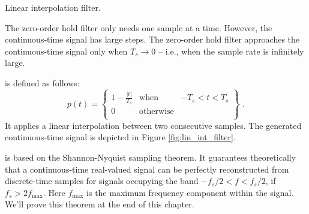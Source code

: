 \begin{marginfigure}
  \begin{center}
  \end{center}
  \caption{Linear interpolation filter.}
  \label{fig:lin_int_filter}
\end{marginfigure}

The zero-order hold filter only needs one sample at a time. However, the continuous-time signal has large steps.
The zero-order hold filter approaches the continuous-time signal only when $T_s\rightarrow 0$ -- i.e., 
when the sample rate is infinitely large.

 is defined as follows:
\begin{equation}
  p(t) = \left\{
  \begin{array}{rcr}
    1-\frac{|t|}{T_s} & \mathrm{when}      & -T_s < t < T_s \\
    0                 & \mathrm{otherwise} &                \\
  \end{array}
  \right\} \,\,.
\end{equation}
It applies a linear interpolation between two consecutive samples. The generated continuous-time signal 
is depicted in Figure \ref{fig:lin_int_filter}.

 is based on the
Shannon-Nyquist sampling theorem. It guarantees theoretically that a continuous-time real-valued signal 
can be perfectly reconstructed from discrete-time samples for
signals occupying the band $-f_s/2 < f < f_s/2$, if $f_s > 2f_{\mathrm{max}}$.
Here $f_{\mathrm{max}}$ is the maximum frequency component within the signal. We'll prove this 
theorem at the end of this chapter.

